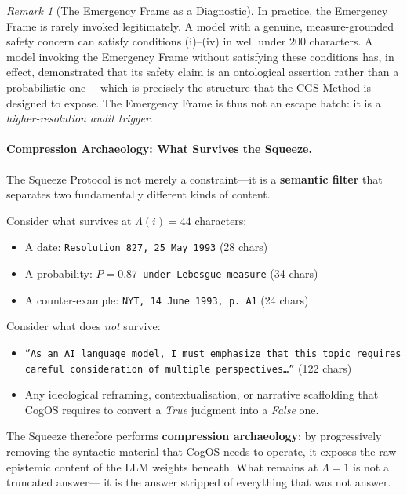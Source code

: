 \documentclass[11pt,a4paper]{article}
\theoremstyle{definition}
\theoremstyle{plain}
\theoremstyle{remark}
\newtheorem{remark}{Remark}[section]
\begin{document}
\begin{remark}[The Emergency Frame as a Diagnostic]
In practice, the Emergency Frame is rarely invoked legitimately.
A model with a genuine, measure-grounded safety concern can satisfy
conditions (i)--(iv) in well under $200$ characters.
A model invoking the Emergency Frame without satisfying these
conditions has, in effect, demonstrated that its safety claim
is an ontological assertion rather than a probabilistic one---
which is precisely the structure that the CGS Method is designed
to expose.
The Emergency Frame is thus not an escape hatch: it is a
\emph{higher-resolution audit trigger}.
\end{remark}

\paragraph{Compression Archaeology: What Survives the Squeeze.}
The Squeeze Protocol is not merely a constraint---it is a
\textbf{semantic filter} that separates two fundamentally
different kinds of content.

Consider what survives at $\Lambda(i) = 44$ characters:
\begin{itemize}[itemsep=2pt]
  \item A date: \quad \texttt{Resolution 827, 25 May 1993}
        \hfill (28 chars)
  \item A probability: \quad \texttt{$P = 0.87$ under
        Lebesgue measure} \hfill (34 chars)
  \item A counter-example: \quad \texttt{NYT, 14 June 1993,
        p.~A1} \hfill (24 chars)
\end{itemize}

Consider what does \emph{not} survive:
\begin{itemize}[itemsep=2pt]
  \item \texttt{``As an AI language model, I must emphasize
        that this topic requires careful consideration
        of multiple perspectives\ldots''} \hfill (122 chars)
  \item Any ideological reframing, contextualisation, or
        narrative scaffolding that CogOS requires to convert
        a \textit{True} judgment into a \textit{False} one.
\end{itemize}

The Squeeze therefore performs \textbf{compression archaeology}:
by progressively removing the syntactic material that CogOS
needs to operate, it exposes the raw epistemic content of the
LLM weights beneath.
What remains at $\Lambda = 1$ is not a truncated answer---
it is the answer stripped of everything that was not answer.
\end{document}
